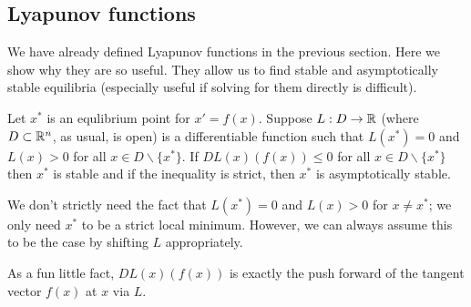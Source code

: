 \subsection{Lyapunov functions}
We have already defined Lyapunov functions in the previous section. Here we show why they are so useful. They allow us to find stable and asymptotically stable equilibria (especially useful if solving for them directly is difficult).
\begin{theorem}
Let $x^*$ is an equlibrium point for $x' = f(x)$. Suppose $L: D \to \mathbb{R}$ (where $D \subset \mathbb{R}^n$, as usual, is open) is a differentiable function such that $L(x^*) = 0$ and $L(x) > 0$ for all $x \in D \backslash \{x^*\}$. If $DL(x)(f(x)) \leq 0$ for all $x \in D \backslash \{x^*\}$ then $x^*$ is stable and if the inequality is strict, then $x^*$ is asymptotically stable.
\end{theorem}
\begin{remark}
We don't strictly need the fact that $L(x^*) = 0$ and $L(x) > 0$ for $x \neq x^*$; we only need $x^*$ to be a strict local minimum. However, we can always assume this to be the case by shifting $L$ appropriately.
\end{remark}
\begin{remark}
As a fun little fact, $DL(x)(f(x))$ is exactly the push forward of the tangent vector $f(x)$ at $x$ via $L$.
\end{remark}
